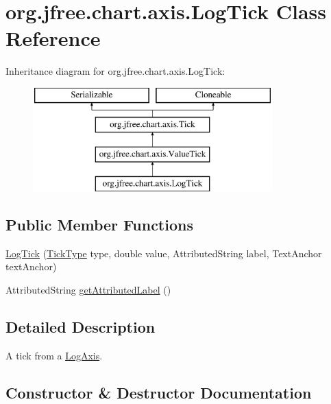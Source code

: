 \hypertarget{classorg_1_1jfree_1_1chart_1_1axis_1_1_log_tick}{}\section{org.\+jfree.\+chart.\+axis.\+Log\+Tick Class Reference}
\label{classorg_1_1jfree_1_1chart_1_1axis_1_1_log_tick}
Inheritance diagram for org.\+jfree.\+chart.\+axis.\+Log\+Tick\+:\begin{figure}[H]
\begin{center}
\leavevmode
\includegraphics[height=4.000000cm]{classorg_1_1jfree_1_1chart_1_1axis_1_1_log_tick}
\end{center}
\end{figure}
\subsection*{Public Member Functions}
\begin{DoxyCompactItemize}
\item 
\mbox{\hyperlink{classorg_1_1jfree_1_1chart_1_1axis_1_1_log_tick_ae225828f1f5ea3553870b81d7c04bcfe}{Log\+Tick}} (\mbox{\hyperlink{classorg_1_1jfree_1_1chart_1_1axis_1_1_tick_type}{Tick\+Type}} type, double value, Attributed\+String label, Text\+Anchor text\+Anchor)
\item 
Attributed\+String \mbox{\hyperlink{classorg_1_1jfree_1_1chart_1_1axis_1_1_log_tick_a605bd2d6bf69926397155f0ac336621d}{get\+Attributed\+Label}} ()
\end{DoxyCompactItemize}


\subsection{Detailed Description}
A tick from a \mbox{\hyperlink{classorg_1_1jfree_1_1chart_1_1axis_1_1_log_axis}{Log\+Axis}}. 

\subsection{Constructor \& Destructor Documentation}
\mbox{\label{classorg_1_1jfree_1_1chart_1_1axis_1_1_log_tick_ae225828f1f5ea3553870b81d7c04bcfe}} 
